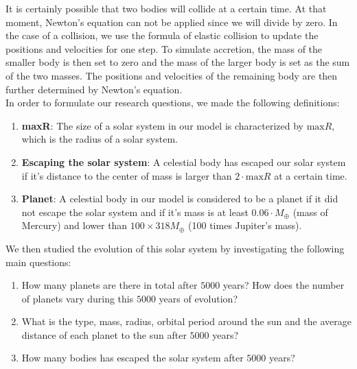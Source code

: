It is certainly possible that two bodies will collide at a certain time. 
At that moment, Newton's equation can not be applied since we will divide by zero. 
In the case of a collision, we use the formula of elastic collision to update the positions and velocities for one step. 
To simulate accretion, the mass of the smaller body is then set to zero and the mass of the larger body is set as the sum of the two masses. 
The positions and velocities of the remaining body are then further determined by Newton's equation.\\

In order to formulate our research questions, we made the following definitions:\\
\begin{enumerate}
\item \textbf{maxR}: The size of a solar system in our model is characterized by $\text{max}R$, which is the radius of a solar system. 
\item \textbf{Escaping the solar system}: A celestial body has escaped our solar system if it's distance to the center of mass is larger than $2\cdot\text{max}R$ at a certain time.
\item \textbf{Planet}: A celestial body in our model is considered to be a planet if it did not escape the solar system and if it's mass is at least $0.06\cdot M_{\oplus}$ (mass of Mercury) and lower than $100\times 318M_{\oplus}$ (100 times Jupiter's mass).
\end{enumerate}
We then studied the evolution of this solar system by investigating the following main questions:
\begin{enumerate}
	\item  How many planets are there in total after $5000$ years? 
	How does the number of planets vary during this $5000$ years of evolution?

	\item What is the type, mass, radius, orbital period around the sun and the average distance of each planet to the sun after $5000$ years?

	\item How many bodies has escaped the solar system after $5000$ years?

\end{enumerate}
 
